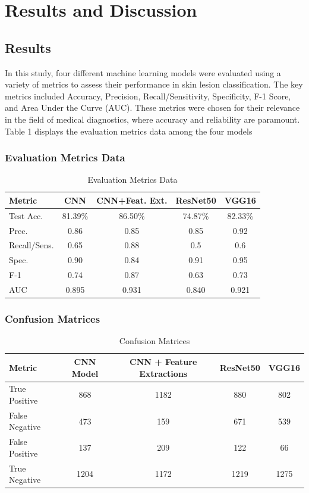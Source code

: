 \documentclass[10pt,twocolumn]{article}
\begin{document}
\section{Results and Discussion}
\subsection{Results}
In this study, four different machine learning models were evaluated using a variety of metrics to assess their performance in skin lesion classification. The key metrics included Accuracy, Precision, Recall/Sensitivity, Specificity, F-1 Score, and Area Under the Curve (AUC). These metrics were chosen for their relevance in the field of medical diagnostics, where accuracy and reliability are paramount. Table 1 displays the evaluation metrics data among the four models
\subsubsection{Evaluation Metrics Data}
\begin{table}[h]
\centering
\caption{Evaluation Metrics Data}
\scriptsize
\setlength\tabcolsep{3pt} 
\begin{tabular}{|l|c|c|c|c|}
\hline
\textbf{Metric} & \textbf{CNN} & \textbf{CNN+Feat. Ext.} & \textbf{ResNet50} & \textbf{VGG16} \\ \hline
Test Acc. & 81.39\% & 86.50\% & 74.87\% & 82.33\% \\ \hline
Prec. & 0.86 & 0.85 & 0.85 & 0.92 \\ \hline
Recall/Sens. & 0.65 & 0.88 & 0.5 & 0.6 \\ \hline
Spec. & 0.90 & 0.84 & 0.91 & 0.95 \\ \hline
F-1 & 0.74 & 0.87 & 0.63 & 0.73 \\ \hline
AUC & 0.895 & 0.931 & 0.840 & 0.921 \\ \hline
\end{tabular}
\end{table}


\subsubsection{Confusion Matrices}
\begin{table}[h]
\centering
\caption{Confusion Matrices}
\scriptsize
\setlength\tabcolsep{3pt} 
\begin{tabular}{|l|c|c|c|c|}
\hline
\textbf{Metric} & \textbf{CNN Model} & \textbf{CNN + Feature Extractions} & \textbf{ResNet50} & \textbf{VGG16} \\ \hline
True Positive & 868 & 1182 & 880 & 802 \\ \hline
False Negative & 473 & 159 & 671 & 539 \\ \hline
False Positive & 137 & 209 & 122 & 66 \\ \hline
True Negative & 1204 & 1172 & 1219 & 1275 \\ \hline
\end{tabular}
\end{table}
\end{document}
